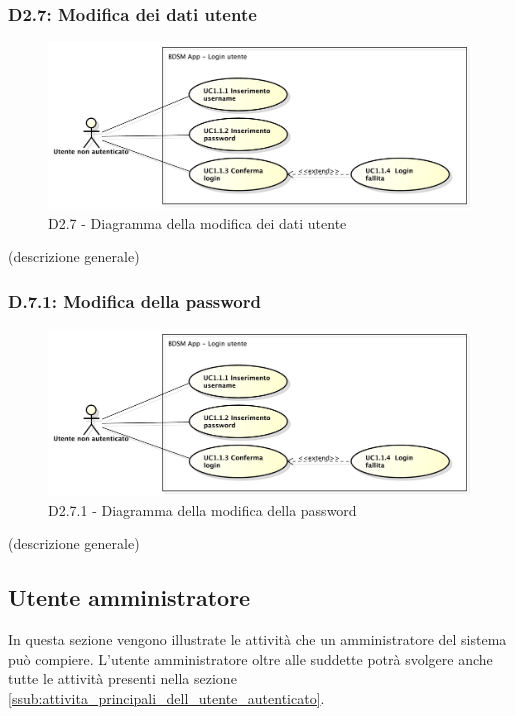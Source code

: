 		\subsubsection{D2.7: Modifica dei dati utente} %
		\label{ssub:modifica_dei_dati_utente}
		\begin{figure}[!htbp]
			\centering
			\centerline{\includegraphics[scale=0.45]{./images/UC1_1.pdf}}
			\caption{D2.7 - Diagramma della modifica dei dati utente}
		\end{figure}
		\noindent
		[TO DO] (descrizione generale)

		\subsubsection{D.7.1: Modifica della password} %
		\label{ssub:modifica_della_password}
		\begin{figure}[!htbp]
			\centering
			\centerline{\includegraphics[scale=0.45]{./images/UC1_1.pdf}}
			\caption{D2.7.1 - Diagramma della modifica della password}
		\end{figure}
		\noindent
		[TO DO] (descrizione generale)


	\pagebreak



	\subsection{Utente amministratore} %
	\label{sub:utente_amministratore}
	In questa sezione vengono illustrate le attività che un amministratore del sistema può compiere. L'utente amministratore oltre alle suddette potrà svolgere anche tutte le attività presenti nella sezione \ref{ssub:attivita_principali_dell_utente_autenticato}.
